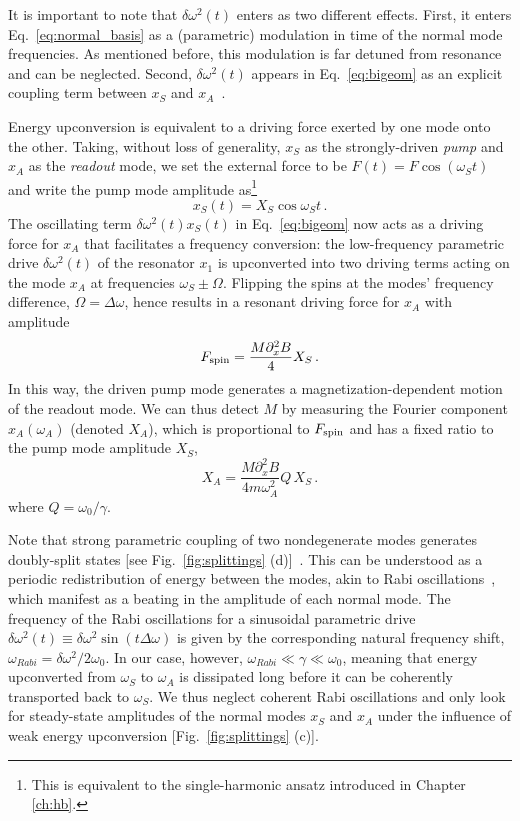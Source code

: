It is important to note that $\delta\omega^2(t)$ enters as two different effects. First, it enters Eq.~\eqref{eq:normal_basis} as a (parametric) modulation in time of the normal mode frequencies. As mentioned before, this modulation is far detuned from resonance and can be neglected. Second, $\delta\omega^2(t)$ appears in Eq.~\eqref{eq:bigeom} as an explicit coupling term between $x_S$ and $x_A$~\cite{Frimmer_2014}.

Energy upconversion is equivalent to a driving force exerted by one mode onto the other. Taking, without loss of generality, $x_S$ as the strongly-driven \textit{pump} and $x_A$ as the \textit{readout} mode, we set the external force to be $F(t) = F \cos(\omega_S t)$ and write the pump mode amplitude as\footnote{This is equivalent to the single-harmonic ansatz introduced in Chapter \ref{ch:hb}.}
\begin{equation} \label{slowflow}
x_{S}(t) = X_S \cos{\omega_{S} t} \,.
\end{equation}
The oscillating term $\delta\omega^2(t)x_S(t)$ in Eq.~\eqref{eq:bigeom} now acts as a driving force for $x_A$ that facilitates a frequency conversion: the low-frequency parametric drive $\delta\omega^2(t)$ of the resonator $x_1$ is upconverted into two driving terms acting on the mode $x_A$ at frequencies $\omega_S \pm \Omega$. Flipping the spins at the modes' frequency difference, $\Omega = \Delta \omega$, hence results in a resonant driving force for $x_A$ with amplitude
\begin{equation} \label{eq:fspin}
F_{\rm spin} = \frac{M \partial_x^2 B}{4} X_S \,.
\end{equation}
In this way, the driven pump mode generates a magnetization-dependent motion of the readout mode. We can thus detect $M$ by measuring the Fourier component $\hat{x}_A(\omega_A)$ (denoted $X_A$), which is proportional to $F_{\rm spin}$ and has a fixed ratio to the pump mode amplitude $X_S$,
\begin{equation} \label{eq:moderatio}
X_A = \frac{M \partial^2_x B}{4 m \omega_A^2} Q \,X_S \,.
\end{equation}
where $Q = \omega_0 / \gamma$.

Note that strong parametric coupling of two nondegenerate modes generates doubly-split states [see Fig.~\ref{fig:splittings} (d)]~\cite{Okamoto_2013, Abdo_2013}. This can be understood as a periodic redistribution of energy between the modes, akin to Rabi oscillations~\cite{Frimmer_2014, Faust_2013, Okamoto_2013_NP}, which manifest as a beating in the amplitude of each normal mode. The frequency of the Rabi oscillations for a sinusoidal parametric drive $\delta\omega^2(t) \equiv \delta\omega^2\sin\left(t\Delta\omega\right)$ is given by the corresponding natural frequency shift, $\omega_{Rabi} = \delta \omega^2 / 2\omega_0$. In our case, however, $\omega_{Rabi} \ll \gamma \ll \omega_0$, meaning that energy upconverted from $\omega_S$ to $\omega_A$ is dissipated long before it can be coherently transported back to $\omega_S$. We thus neglect coherent Rabi oscillations and only look for steady-state amplitudes of the normal modes $x_S$ and $x_A$ under the influence of weak energy upconversion [Fig.~\ref{fig:splittings} (c)].

